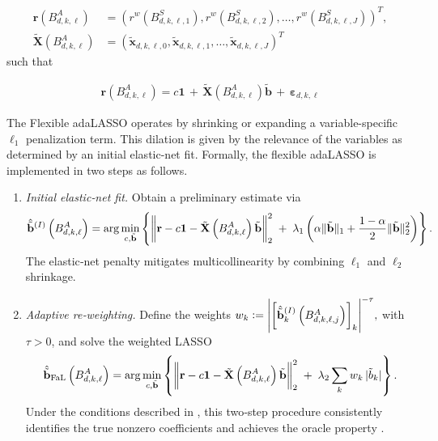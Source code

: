 \documentclass{rQUF2e}
\theoremstyle{plain}
\theoremstyle{definition}
\theoremstyle{remark}
\DeclarePairedDelimiter{\norma}{\lVert}{\rVert} %
\DeclarePairedDelimiter{\aval}{\lvert}{\rvert} %
\begin{document}
\begin{align*}
    \mathbf{r}\left( B^A_{d, k, \ell} \right)         & = \left( r^w\left( B^S_{d, k, \ell, 1} \right), r^w\left( B^S_{d, k, \ell, 2}\right), \dots, r^w\left( B^S_{d, k, \ell, J} \right) \right)^T, \\
    \tilde{\mathbf{X}}\left( B^A_{d, k, \ell} \right) & = \left( \tilde{\mathbf{x}}_{d,k,\ell,0}, \tilde{\mathbf{x}}_{d,k,\ell,1}, \dots, \tilde{\mathbf{x}}_{d,k,\ell,J}  \right)^T
\end{align*}
such that

\begin{align*}
    \mathbf{r}\left( B^A_{d, k, \ell} \right) = c \mathbf{1} \, + \, \tilde{\mathbf{X}}\left( B^A_{d, k, \ell} \right) \tilde{\mathbf{b}} \, + \, \boldsymbol{\varepsilon}_{d, k, \ell}
\end{align*}


The Flexible adaLASSO operates by shrinking or expanding a variable-specific $\ell_1$ penalization term. This dilation is given by the relevance of the variables as determined by an initial elastic-net fit. Formally, the flexible adaLASSO is implemented in two steps as follows.

\begin{enumerate}[label=(\roman*)]
    \item \emph{Initial elastic‐net fit.}  Obtain a preliminary estimate via
          \[
              \hat{\tilde{\mathbf{b}}}^{(I)} \left( B^A_{d, k, \ell} \right)
              = \arg\min_{c, \tilde{\mathbf{b}}} \left\{
              \norma*{\mathbf{r} - c \mathbf{1} - \tilde{\mathbf{X}} \left( B^A_{d, k, \ell}\right)\tilde{\mathbf{b}}}_2^2
              \;+\;\lambda_1\left(\alpha\|\tilde{\mathbf{b}}\|_1 + \frac{1-\alpha}{2} \|\tilde{\mathbf{b}}\|_2^2\right) \right\}.
          \]
          The elastic‐net penalty mitigates multicollinearity by combining \(\ell_1\) and \(\ell_2\) shrinkage.

    \item \emph{Adaptive re‐weighting.}  Define the weights
          \(
          w_k := \aval*{\left[\hat{\tilde{\mathbf{b}}}_k^{(I)}\left( B^A_{d, k, \ell, j} \right) \right]_{k}}^{-\tau},
          \)
          with \(\tau>0\), and solve the weighted LASSO
          \[
              \hat{\tilde{\mathbf{b}}}_{\mathrm{FaL}} \left( B^A_{d, k, \ell} \right)
              = \arg\min_{c, \tilde{\mathbf{b}}} \left\{
              \norma*{\mathbf{r} - c \mathbf{1} -  \tilde{\mathbf{X}} \left( B^A_{d, k, \ell}\right)\tilde{\mathbf{b}}}_2^2
              \;+\;\lambda_2\sum_{k} w_k\,|\tilde b_k| \right\}.
          \]
          Under the conditions described in \citep{MEDEIROS2016255}, this two‐step procedure consistently identifies the true nonzero coefficients and achieves the oracle property \citep{MEDEIROS2016255}.
\end{enumerate}
\end{document}

